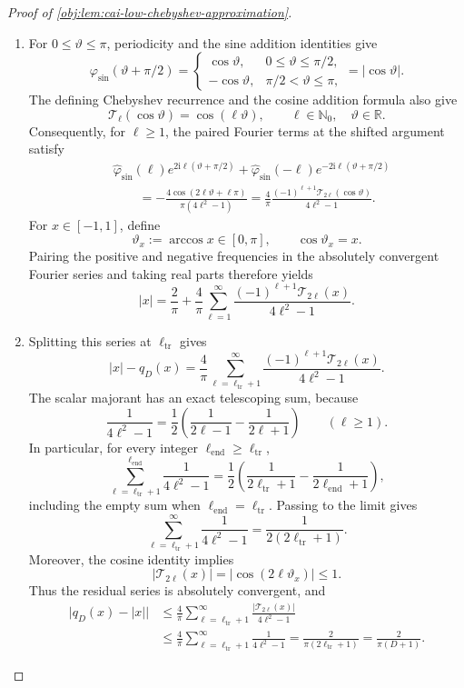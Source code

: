 \begin{proof}[Proof of \cref{obj:lem:cai-low-chebyshev-approximation}]
\begin{enumerate}
\item For \(0\le\vartheta\le\pi\), periodicity and the sine addition identities give
\[
\varphi_{\sin}(\vartheta+\pi/2)
=
\begin{cases}
\cos\vartheta,&0\le\vartheta\le\pi/2,\\
-\cos\vartheta,&\pi/2<\vartheta\le\pi,
\end{cases}
=|\cos\vartheta|.
\]
The defining Chebyshev recurrence and the cosine addition formula also give
\[
\mathcal T_\ell(\cos\vartheta)=\cos(\ell\vartheta),
\qquad \ell\in\mathbb N_0,\quad \vartheta\in\mathbb R.
\]
Consequently, for \(\ell\ge1\), the paired Fourier terms at the shifted argument satisfy
\[
\begin{aligned}
&\widehat\varphi_{\sin}(\ell)
 e^{2\mathrm i\ell(\vartheta+\pi/2)}
+\widehat\varphi_{\sin}(-\ell)
 e^{-2\mathrm i\ell(\vartheta+\pi/2)}
\\
&\qquad
=-\frac{4\cos(2\ell\vartheta+\ell\pi)}
 {\pi(4\ell^2-1)}
=\frac4\pi
 \frac{(-1)^{\ell+1}\mathcal T_{2\ell}(\cos\vartheta)}
 {4\ell^2-1}.
\end{aligned}
\]
For \(x\in[-1,1]\), define
\[
\vartheta_x:=\arccos x\in[0,\pi],
\qquad \cos\vartheta_x=x.
\]
Pairing the positive and negative frequencies in the absolutely convergent Fourier series and taking real parts therefore yields
\[
|x|=\frac2\pi+\frac4\pi\sum_{\ell=1}^{\infty}
 \frac{(-1)^{\ell+1}\mathcal T_{2\ell}(x)}
 {4\ell^2-1}.
\]

\item Splitting this series at \(\ell_{\mathrm{tr}}\) gives
\[
|x|-q_D(x)
=\frac4\pi\sum_{\ell=\ell_{\mathrm{tr}}+1}^{\infty}
 \frac{(-1)^{\ell+1}\mathcal T_{2\ell}(x)}
 {4\ell^2-1}.
\]
The scalar majorant has an exact telescoping sum, because
\[
\frac1{4\ell^2-1}
=\frac12\left(\frac1{2\ell-1}-\frac1{2\ell+1}\right)
\qquad(\ell\ge1).
\]
In particular, for every integer \(\ell_{\mathrm{end}}\ge\ell_{\mathrm{tr}}\),
\[
\sum_{\ell=\ell_{\mathrm{tr}}+1}^{\ell_{\mathrm{end}}}
 \frac1{4\ell^2-1}
=\frac12\left(
 \frac1{2\ell_{\mathrm{tr}}+1}
 -\frac1{2\ell_{\mathrm{end}}+1}\right),
\]
including the empty sum when \(\ell_{\mathrm{end}}=\ell_{\mathrm{tr}}\). Passing to the limit gives
\[
\sum_{\ell=\ell_{\mathrm{tr}}+1}^{\infty}
 \frac1{4\ell^2-1}
=\frac1{2(2\ell_{\mathrm{tr}}+1)}.
\]
Moreover, the cosine identity implies
\[
|\mathcal T_{2\ell}(x)|
=|\cos(2\ell\vartheta_x)|\le1.
\]
Thus the residual series is absolutely convergent, and
\[
\begin{aligned}
\bigl|q_D(x)-|x|\bigr|
&\le\frac4\pi
 \sum_{\ell=\ell_{\mathrm{tr}}+1}^{\infty}
 \frac{|\mathcal T_{2\ell}(x)|}{4\ell^2-1}\\
&\le\frac4\pi
 \sum_{\ell=\ell_{\mathrm{tr}}+1}^{\infty}
 \frac1{4\ell^2-1}
=\frac2{\pi(2\ell_{\mathrm{tr}}+1)}
=\frac2{\pi(D+1)}.
\end{aligned}
\]


\end{enumerate}
\end{proof}

